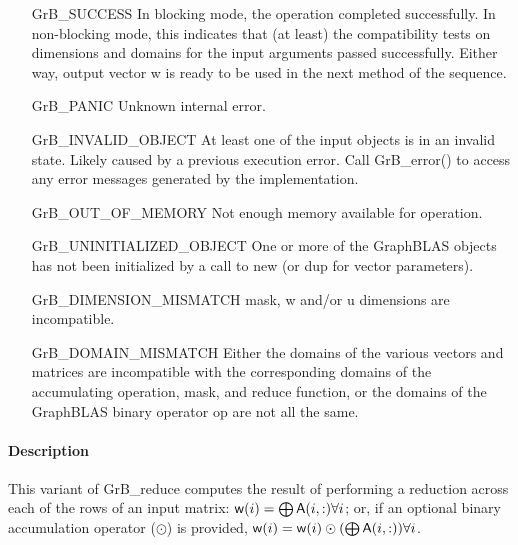 \begin{itemize}[leftmargin=2.1in]
    \item[{\sf GrB\_SUCCESS}]         In blocking mode, the operation completed
	    successfully. In non-blocking mode, this indicates that (at least) the compatibility 
    tests on dimensions and domains for the input arguments passed successfully. 
    Either way, output vector {\sf w} is ready to be used in the next method of 
    the sequence.

    \item[{\sf GrB\_PANIC}]            Unknown internal error.
    
    \item[{\sf GrB\_INVALID\_OBJECT}] At least one of the input objects is
	    in an invalid state. Likely caused by a previous execution error.
    Call {\sf GrB\_error()} to access 
    any error messages generated by the implementation.

    \item[{\sf GrB\_OUT\_OF\_MEMORY}]  Not enough memory available for operation.
    
    \item[{\sf GrB\_UNINITIALIZED\_OBJECT}] One or more of the GraphBLAS objects 
    has not been initialized by a call to {\sf new} (or {\sf dup} for vector
    parameters).
    
    \item[{\sf GrB\_DIMENSION\_MISMATCH}]  {\sf mask}, {\sf w} and/or {\sf u} dimensions are
    incompatible. 
    
    \item[{\sf GrB\_DOMAIN\_MISMATCH}]    Either the domains of the various vectors and matrices are
	incompatible with the corresponding domains of the accumulating operation, 
		mask, and reduce function, or the domains of the GraphBLAS binary operator {\sf op} are not all the same.
\end{itemize}

\paragraph{Description}

This variant of {\sf GrB\_reduce} computes the result of performing
a reduction across each of the rows of an input matrix:
${\sf w}(i) = \bigoplus {\sf A}(i,:) \forall i$; 
or, if an optional binary accumulation 
operator ($\odot$) is provided, ${\sf w}(i) = {\sf w}(i) \odot (\bigoplus {\sf A}(i,:)) \forall i$.  


